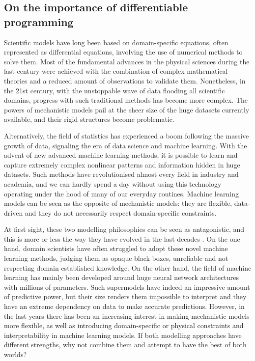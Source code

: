 
\subsection{On the importance of differentiable programming}

Scientific models have long been based on domain-specific equations, often represented as differential equations, involving the use of numerical methods to solve them. Most of the fundamental advances in the physical sciences during the last century were achieved with the combination of complex mathematical theories and a reduced amount of observations to validate them. Nonetheless, in the 21st century, with the unstoppable wave of data flooding all scientific domains, progress with such traditional methods has become more complex. The powers of mechanistic models pail at the sheer size of the huge datasets currently available, and their rigid structures become problematic. 

Alternatively, the field of statistics has experienced a boom following the massive growth of data, signaling the era of data science and machine learning. With the advent of new advanced machine learning methods, it is possible to learn and capture extremely complex nonlinear patterns and information hidden in huge datasets. Such methods have revolutionised almost every field in industry and academia, and we can hardly spend a day without using this technology operating under the hood of many of our everyday routines. Machine learning models can be seen as the opposite of mechanistic models: they are flexible, data-driven and they do not necessarily respect domain-specific constraints.

At first sight, these two modelling philosophies can be seen as antagonistic, and this is more or less the way they have evolved in the last decades \cite{zdeborova_understanding_2020}. On the one hand, domain scientists have often struggled to adopt these novel machine learning methods, judging them as opaque black boxes, unreliable and not respecting domain established knowledge. On the other hand, the field of machine learning has mainly been developed around huge neural network architectures with millions of parameters. Such supermodels have indeed an impressive amount of predictive power, but their size renders them impossible to interpret and they have an extreme dependency on data to make accurate predictions. However, in the last years there has been an increasing interest in making mechanistic models more flexible, as well as introducing domain-specific or physical constraints and interpretability in machine learning models. If both modelling approaches have different strengths, why not combine them and attempt to have the best of both worlds?

